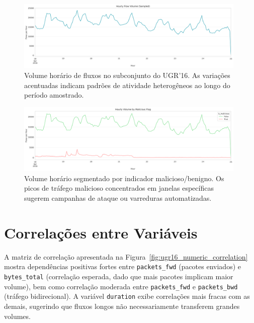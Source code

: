 \documentclass[a4paper, 12pt]{article}
\begin{document}
\begin{figure}[H]
    \centering
    \includegraphics[width=0.98\textwidth]{ugr16_hourly_activity.png}
    \caption{Volume horário de fluxos no subconjunto do UGR'16. As variações acentuadas indicam padrões de atividade heterogêneos ao longo do período amostrado.}
    \label{fig:ugr16_hourly_activity}
\end{figure}

\begin{figure}[H]
    \centering
    \includegraphics[width=0.98\textwidth]{ugr16_hourly_activity_by_label.png}
    \caption{Volume horário segmentado por indicador malicioso/benigno. Os picos de tráfego malicioso concentrados em janelas específicas sugerem campanhas de ataque ou varreduras automatizadas.}
    \label{fig:ugr16_hourly_activity_by_label}
\end{figure}



\section{Correlações entre Variáveis}
A matriz de correlação apresentada na Figura~\ref{fig:ugr16_numeric_correlation} mostra dependências positivas fortes entre \texttt{packets\_fwd} (pacotes enviados) e \texttt{bytes\_total} (correlação esperada, dado que mais pacotes implicam maior volume), bem como correlação moderada entre \texttt{packets\_fwd} e \texttt{packets\_bwd} (tráfego bidirecional). A variável \texttt{duration} exibe correlações mais fracas com as demais, sugerindo que fluxos longos não necessariamente transferem grandes volumes.
\end{document}
